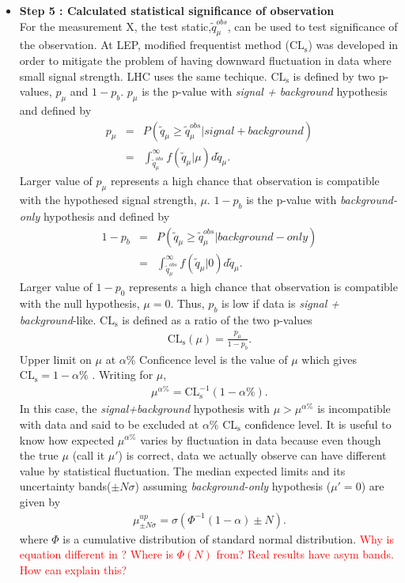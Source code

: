 \begin{itemize}
%
\item{\textbf{Step 5 : Calculated statistical significance of observation }}  \\
For the measurement X, the test static,$\tilde{q}_\mu^{obs}$, can be used to 
test significance of the observation. At LEP, modified frequentist method 
($\textrm{CL}_\textrm{s}$) 
was developed in order to mitigate the problem of having downward fluctuation 
in data where small signal strength. LHC uses the same techique. 
$\textrm{CL}_\textrm{s}$ is defined by two p-values, $p_\mu$ and $1-p_b$. 
$p_\mu$ is the p-value with \textit{signal + background} hypothesis and defined by 
\begin{eqnarray} 
p_\mu
&=& P\left(\tilde{q}_\mu \ge \tilde{q}_\mu^{obs} | signal+background \right)  \\
&=& \int^{\infty}_{\tilde{q}_\mu^{obs}}  f\left(  \tilde{q}_\mu | \mu \right) d\tilde{q}_\mu.
\end{eqnarray} 
Larger value of $p_\mu$ represents a high chance that observation is compatible 
with the hypothesed signal strength, $\mu$.
$1-p_b$ is the p-value with \textit{background-only} hypothesis and defined by 
\begin{eqnarray} 
1-p_b
&=& P\left(\tilde{q}_\mu \ge \tilde{q}_\mu^{obs} | background-only \right)  \\
&=& \int^{\infty}_{\tilde{q}_\mu^{obs}}  f\left(  \tilde{q}_\mu | 0 \right) d\tilde{q}_\mu.
\end{eqnarray} 
Larger value of $1-p_0$ represents a high chance that observation is compatible 
with the null hypothesis, $\mu=0$. Thus, $p_b$ is low if data is 
\textit{signal + background}-like. 
$\textrm{CL}_\textrm{s}$ is defined as a ratio of the two p-values 
\begin{eqnarray} 
\textrm{CL}_\textrm{s} \left( \mu \right) = \frac{p_\mu}{1 - p_b}.   
\end{eqnarray} 
Upper limit on $\mu$ at $\alpha$\% Conficence level is the value of $\mu$  
which gives $\textrm{CL}_\textrm{s} = 1 - \alpha \%$ . Writing for $\mu$, 
\begin{eqnarray} 
\mu^{\alpha \%} = \textrm{CL}_\textrm{s}^{-1} ( 1-\alpha\%).
\end{eqnarray} 
In this case, the \textit{signal+background} hypothesis with $\mu > \mu^{\alpha \%}$
is incompatible with data and said to be excluded at $\alpha\%$ $\textrm{CL}_\textrm{s}$ 
confidence level.
It is useful to know how expected $\mu^{\alpha \%}$ varies by fluctuation in data
because even though the true $\mu$ (call it $\mu'$) is correct, data we actually observe 
can have different value by statistical fluctuation.  
The median expected limits and its uncertainty bands($\pm N\sigma$) 
assuming \textit{background-only} hypothesis ($\mu'=0$) are given by 
\begin{eqnarray} 
\mu^{up}_{\pm N\sigma} 
= 
\sigma \left( \Phi^{-1}(1-\alpha) \pm N \right). 
\end{eqnarray} 
where $\Phi$ is a cumulative distribution of standard normal distribution.
\textcolor{red}{Why is equation different in \cite{combination_stat}? 
Where is $\Phi(N)$ from? Real results have asym bands. How can explain this?}
\end{itemize}

